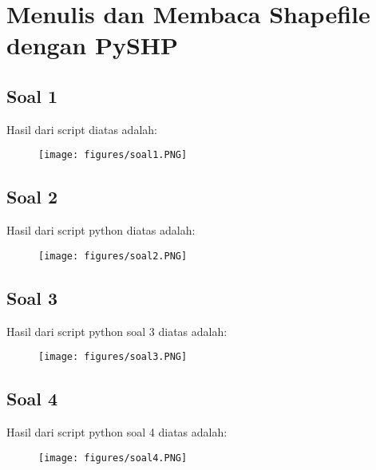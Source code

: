 \chapter{Menulis dan Membaca Shapefile dengan PySHP}
\section{Soal 1}

\par Hasil dari script diatas adalah: 
\begin{figure}[!htbp]
    \centering
    \texttt{[image: figures/soal1.PNG]}
    \label{soal1}
\end{figure}

\section{Soal 2}


\par Hasil dari script python diatas adalah:
\begin{figure}[!htbp]
    \centering
    \texttt{[image: figures/soal2.PNG]}
    \label{soal2}
\end{figure}

\section{Soal 3}

\par Hasil dari script python soal 3 diatas adalah: 
\begin{figure}[!htbp]
    \centering
    \texttt{[image: figures/soal3.PNG]}
    \label{soal3}
\end{figure}

\section{Soal 4}


\par Hasil dari script python soal 4 diatas adalah: 
\begin{figure}[!htbp]
    \centering
    \texttt{[image: figures/soal4.PNG]}
    \label{soal4}
\end{figure}

